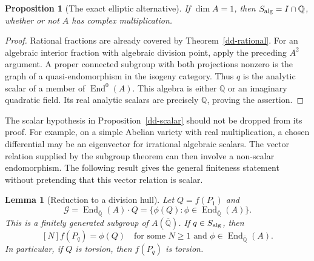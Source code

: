 \documentclass[11pt,a4paper]{article}
\newtheorem{proposition}[theorem]{Proposition}
\newtheorem{lemma}[theorem]{Lemma}
\theoremstyle{definition}
\theoremstyle{remark}
\numberwithin{equation}{section}
\newcommand{\Qbar}{\overline{\mathbb Q}}
\begin{document}
\begin{proposition}[The exact elliptic alternative]\label{dd-elliptic-alg}
If $\dim A=1$, then $S_{\rm alg}=I\cap\mathbb Q$, whether or not
$A$ has complex multiplication.
\end{proposition}
\begin{proof}
Rational fractions are already covered by Theorem~\ref{dd-rational}.
For an algebraic interior fraction with algebraic division point,
apply the preceding $A^2$ argument.  A proper connected subgroup with
both projections nonzero is the graph of a quasi-endomorphism in the
isogeny category.  Thus $q$ is the analytic scalar of a member of
$\operatorname{End}^0(A)$.  This algebra is either $\mathbb Q$ or an
imaginary quadratic field.  Its real analytic scalars are precisely
$\mathbb Q$, proving the assertion.
\end{proof}

The scalar hypothesis in Proposition~\ref{dd-scalar} should not be
dropped from its proof.  For example, on a simple Abelian variety with
real multiplication, a chosen differential may be an eigenvector for
irrational algebraic scalars.  The vector relation supplied by the
subgroup theorem can then involve a non-scalar endomorphism.  The
following result gives the general finiteness statement without
pretending that this vector relation is scalar.

\begin{lemma}[Reduction to a division hull]\label{dd-hull}
Let $Q=f(P_1)$ and
\[
 \mathcal G=\operatorname{End}_{\Qbar}(A)\cdot Q
 =\{\phi(Q):\phi\in\operatorname{End}_{\Qbar}(A)\}.
\]
This is a finitely generated subgroup of $A(\Qbar)$.  If
$q\in S_{\rm alg}$, then
\begin{equation}\label{dd-hull-eq}
 [N]f(P_q)=\phi(Q)
 \quad\text{for some }N\ge1\text{ and }
 \phi\in\operatorname{End}_{\Qbar}(A).
\end{equation}
In particular, if $Q$ is torsion, then $f(P_q)$ is torsion.
\end{lemma}
\end{document}
